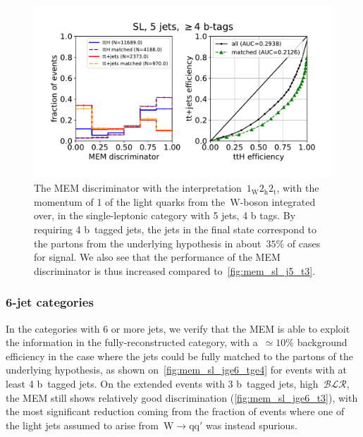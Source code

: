 \begin{figure}
\begin{centering}
\includegraphics[width = 1.0\textwidth]{figures/mem_sl_j5_tge4.pdf}
\caption[The MEM discriminator with the~$1_{\mathrm{W}} 2_{\mathrm{h}} 2_{\mathrm{t}}$ interpretation in the 5 jet, $\ge4$ b-tags category]{The MEM discriminator with the interpretation~$1_{\mathrm{W}} 2_{\mathrm{h}} 2_{\mathrm{t}}$, with the momentum of 1 of the light quarks from the~$\mathrm{W}$-boson integrated over, in the single-leptonic category with 5 jets, 4 b tags. By requiring 4 b~tagged jets, the jets in the final state correspond to the partons from the underlying hypothesis in about~$35\%$ of cases for signal. We also see that the performance of the MEM discriminator is thus increased compared to~\cref{fig:mem_sl_j5_t3}.}
\label{fig:mem_sl_j5_t4}
\end{centering}
\end{figure}

\subsubsection{6-jet categories}
In the categories with 6 or more jets, we verify that the MEM is able to exploit the information in the fully-reconstructed category, with a~$\simeq 10\%$ background efficiency in the case where the jets could be fully matched to the partons of the underlying hypothesis, as shown on~\cref{fig:mem_sl_jge6_tge4} for events with at least 4 b~tagged jets. On the extended events with 3 b~tagged jets, high~$\mathcal{BLR}$, the MEM still shows relatively good discrimination (\cref{fig:mem_sl_jge6_t3}), with the most significant reduction coming from the fraction of events where one of the light jets assumed to arise from~$\mathrm{W} \rightarrow \mathrm{q} \mathrm{q}'$ was instead spurious.

